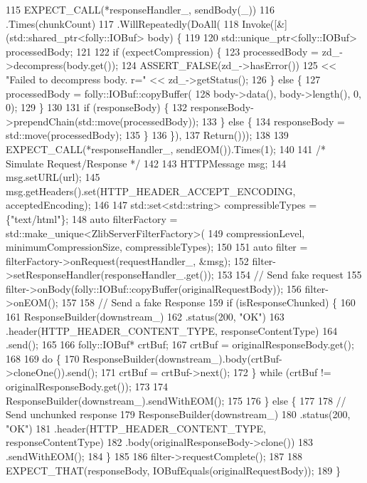 \begin{DoxyCode}
115     EXPECT\_CALL(*responseHandler_, sendBody(\_))
116         .Times(chunkCount)
117         .WillRepeatedly(DoAll(
118             Invoke([&](std::shared\_ptr<folly::IOBuf> body) \{
119 
120               std::unique\_ptr<folly::IOBuf> processedBody;
121 
122               \textcolor{keywordflow}{if} (expectCompression) \{
123                 processedBody = zd_->decompress(body.get());
124                 ASSERT\_FALSE(zd_->hasError())
125                     << \textcolor{stringliteral}{"Failed to decompress body. r="} << zd_->getStatus();
126               \} \textcolor{keywordflow}{else} \{
127                 processedBody = folly::IOBuf::copyBuffer(
128                     body->data(), body->length(), 0, 0);
129               \}
130 
131               \textcolor{keywordflow}{if} (responseBody) \{
132                 responseBody->prependChain(std::move(processedBody));
133               \} \textcolor{keywordflow}{else} \{
134                 responseBody = std::move(processedBody);
135               \}
136             \}),
137             Return()));
138 
139     EXPECT\_CALL(*responseHandler_, sendEOM()).Times(1);
140 
141     \textcolor{comment}{/* Simulate Request/Response  */}
142 
143     HTTPMessage msg;
144     msg.setURL(url);
145     msg.getHeaders().set(HTTP\_HEADER\_ACCEPT\_ENCODING, acceptedEncoding);
146 
147     std::set<std::string> compressibleTypes = \{\textcolor{stringliteral}{"text/html"}\};
148     \textcolor{keyword}{auto} filterFactory = std::make\_unique<ZlibServerFilterFactory>(
149         compressionLevel, minimumCompressionSize, compressibleTypes);
150 
151     \textcolor{keyword}{auto} filter = filterFactory->onRequest(requestHandler_, &msg);
152     filter->setResponseHandler(responseHandler_.get());
153 
154     \textcolor{comment}{// Send fake request}
155     filter->onBody(folly::IOBuf::copyBuffer(originalRequestBody));
156     filter->onEOM();
157 
158     \textcolor{comment}{// Send a fake Response}
159     \textcolor{keywordflow}{if} (isResponseChunked) \{
160 
161       ResponseBuilder(downstream_)
162         .status(200, \textcolor{stringliteral}{"OK"})
163         .header(HTTP\_HEADER\_CONTENT\_TYPE, responseContentType)
164         .send();
165 
166       folly::IOBuf* crtBuf;
167       crtBuf = originalResponseBody.get();
168 
169       \textcolor{keywordflow}{do} \{
170         ResponseBuilder(downstream_).body(crtBuf->cloneOne()).send();
171         crtBuf = crtBuf->next();
172       \} \textcolor{keywordflow}{while} (crtBuf != originalResponseBody.get());
173 
174       ResponseBuilder(downstream_).sendWithEOM();
175 
176     \} \textcolor{keywordflow}{else} \{
177 
178       \textcolor{comment}{// Send unchunked response}
179       ResponseBuilder(downstream_)
180           .status(200, \textcolor{stringliteral}{"OK"})
181           .header(HTTP\_HEADER\_CONTENT\_TYPE, responseContentType)
182           .body(originalResponseBody->clone())
183           .sendWithEOM();
184     \}
185 
186     filter->requestComplete();
187 
188     EXPECT\_THAT(responseBody, IOBufEquals(originalRequestBody));
189   \}
\end{DoxyCode}
